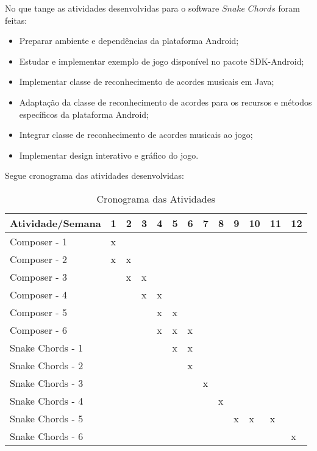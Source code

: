 No que tange as atividades desenvolvidas para o software $Snake$ $Chords$ foram feitas:
\begin{itemize}
	\item Preparar ambiente e dependências da plataforma Android;
	\item Estudar e implementar exemplo de jogo disponível no pacote SDK-Android;
	\item Implementar classe de reconhecimento de acordes musicais em Java;
	\item Adaptação da classe de reconhecimento de acordes para os recursos e métodos específicos da plataforma Android;
	\item Integrar classe de reconhecimento de acordes musicais ao jogo;
	\item Implementar design interativo e gráfico do jogo.
\end{itemize}

Segue cronograma das atividades desenvolvidas:
\begin{table}[h]
\centering
\caption{Cronograma das Atividades}
\label{my-label}
\begin{tabular}{|l|l|l|l|l|l|l|l|l|l|l|l|l|}
\hline
Atividade/Semana & 1 & 2 & 3 & 4 & 5 & 6 & 7 & 8 & 9 & 10 & 11 & 12 \\ \hline
Composer - 1     & x &   &   &   &   &   &   &   &   &    &    &    \\ \hline
Composer - 2     & x & x &   &   &   &   &   &   &   &    &    &    \\ \hline
Composer - 3     &   & x & x &   &   &   &   &   &   &    &    &    \\ \hline
Composer - 4     &   &   & x & x &   &   &   &   &   &    &    &    \\ \hline
Composer - 5     &   &   &   & x & x &   &   &   &   &    &    &    \\ \hline
Composer - 6     &   &   &   & x & x & x &   &   &   &    &    &    \\ \hline
Snake Chords - 1 &   &   &   &   & x & x &   &   &   &    &    &    \\ \hline
Snake Chords - 2 &   &   &   &   &   & x &   &   &   &    &    &    \\ \hline
Snake Chords - 3 &   &   &   &   &   &   & x &   &   &    &    &    \\ \hline
Snake Chords - 4 &   &   &   &   &   &   &   & x &   &    &    &    \\ \hline
Snake Chords - 5 &   &   &   &   &   &   &   &   & x & x  & x  &    \\ \hline
Snake Chords - 6 &   &   &   &   &   &   &   &   &   &    &    & x  \\ \hline
\end{tabular}
\end{table}
